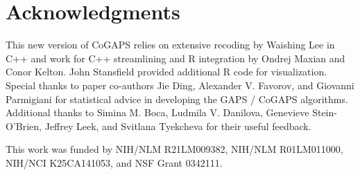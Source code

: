 \documentclass{report}
\begin{document}
\chapter{Acknowledgments}

\par This new version of CoGAPS relies on extensive recoding by Waishing Lee in C++ and work for C++ streamlining and R integration by Ondrej Maxian and Conor Kelton.  John Stansfield provided additional R code for visualization. Special thanks to paper co-authors Jie Ding, Alexander V. Favorov, and Giovanni Parmigiani for statistical advice in developing the GAPS / CoGAPS algorithms.  Additional thanks to Simina M. Boca, Ludmila V. Danilova, Genevieve Stein-O'Brien, Jeffrey Leek, and Svitlana Tyekcheva for their useful feedback.

\par This work was funded by NIH/NLM R21LM009382, NIH/NLM R01LM011000, NIH/NCI K25CA141053, and NSF Grant 0342111.



\end{document}

